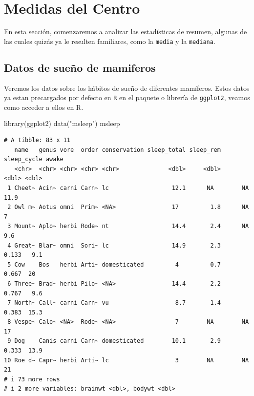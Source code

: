 \documentclass[
  letterpaper,
  DIV=11,
  numbers=noendperiod]{scrreprt}
\newenvironment{Shaded}{\begin{snugshade}}{\end{snugshade}}
\newcommand{\FunctionTok}[1]{\textcolor[rgb]{0.28,0.35,0.67}{#1}}
\newcommand{\NormalTok}[1]{\textcolor[rgb]{0.00,0.23,0.31}{#1}}
\newcommand{\StringTok}[1]{\textcolor[rgb]{0.13,0.47,0.30}{#1}}
\begin{document}
\hypertarget{medidas-del-centro}{%
\section{Medidas del Centro}\label{medidas-del-centro}}

En esta sección, comenzaremos a analizar las estadísticas de resumen,
algunas de las cuales quizás ya le resulten familiares, como la
\texttt{media} y la \texttt{mediana}.

\hypertarget{datos-de-sueuxf1o-de-mamiferos}{%
\subsection{Datos de sueño de
mamiferos}\label{datos-de-sueuxf1o-de-mamiferos}}

Veremos los datos sobre los hábitos de sueño de diferentes mamíferos.
Estos datos ya estan precargados por defecto en \texttt{R} en el paquete
o librería de \texttt{ggplot2}, veamos como acceder a ellos en R.

\begin{Shaded}
\begin{Highlighting}[]
\FunctionTok{library}\NormalTok{(ggplot2)  }
\FunctionTok{data}\NormalTok{(}\StringTok{"msleep"}\NormalTok{) }
\NormalTok{msleep}
\end{Highlighting}
\end{Shaded}

\begin{verbatim}
# A tibble: 83 x 11
   name   genus vore  order conservation sleep_total sleep_rem sleep_cycle awake
   <chr>  <chr> <chr> <chr> <chr>              <dbl>     <dbl>       <dbl> <dbl>
 1 Cheet~ Acin~ carni Carn~ lc                  12.1      NA        NA      11.9
 2 Owl m~ Aotus omni  Prim~ <NA>                17         1.8      NA       7  
 3 Mount~ Aplo~ herbi Rode~ nt                  14.4       2.4      NA       9.6
 4 Great~ Blar~ omni  Sori~ lc                  14.9       2.3       0.133   9.1
 5 Cow    Bos   herbi Arti~ domesticated         4         0.7       0.667  20  
 6 Three~ Brad~ herbi Pilo~ <NA>                14.4       2.2       0.767   9.6
 7 North~ Call~ carni Carn~ vu                   8.7       1.4       0.383  15.3
 8 Vespe~ Calo~ <NA>  Rode~ <NA>                 7        NA        NA      17  
 9 Dog    Canis carni Carn~ domesticated        10.1       2.9       0.333  13.9
10 Roe d~ Capr~ herbi Arti~ lc                   3        NA        NA      21  
# i 73 more rows
# i 2 more variables: brainwt <dbl>, bodywt <dbl>
\end{verbatim}
\end{document}
